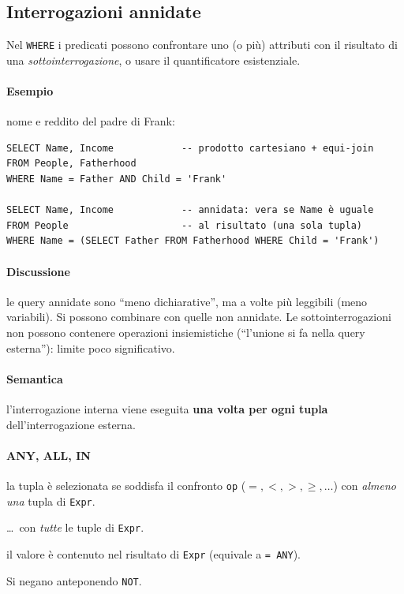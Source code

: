 \documentclass[a4paper,12pt]{article}
\begin{document}
\subsection{Interrogazioni annidate}

Nel \texttt{WHERE} i predicati possono confrontare uno (o più) attributi con il
risultato di una \emph{sottointerrogazione}, o usare il quantificatore
esistenziale.

\paragraph{Esempio} nome e reddito del padre di Frank:
\begin{verbatim}
SELECT Name, Income            -- prodotto cartesiano + equi-join
FROM People, Fatherhood
WHERE Name = Father AND Child = 'Frank'

SELECT Name, Income            -- annidata: vera se Name è uguale
FROM People                    -- al risultato (una sola tupla)
WHERE Name = (SELECT Father FROM Fatherhood WHERE Child = 'Frank')
\end{verbatim}

\paragraph{Discussione} le query annidate sono ``meno dichiarative'', ma a
volte più leggibili (meno variabili). Si possono combinare con quelle non
annidate. Le sottointerrogazioni non possono contenere operazioni insiemistiche
(``l'unione si fa nella query esterna''): limite poco significativo.

\paragraph{Semantica} l'interrogazione interna viene eseguita \textbf{una volta
per ogni tupla} dell'interrogazione esterna.

\paragraph{ANY, ALL, IN}
\begin{description}[style=nextline]
  \item[\texttt{Attributo op ANY (Expr)}] la tupla è selezionata se soddisfa il
    confronto \texttt{op} ($=, <, >, \geq, \dots$) con \emph{almeno una} tupla
    di \texttt{Expr}.
  \item[\texttt{Attributo op ALL (Expr)}] \dots\ con \emph{tutte} le tuple di
    \texttt{Expr}.
  \item[\texttt{Attributo IN (Expr)}] il valore è contenuto nel risultato di
    \texttt{Expr} (equivale a \texttt{= ANY}).
\end{description}
Si negano anteponendo \texttt{NOT}.
\end{document}
